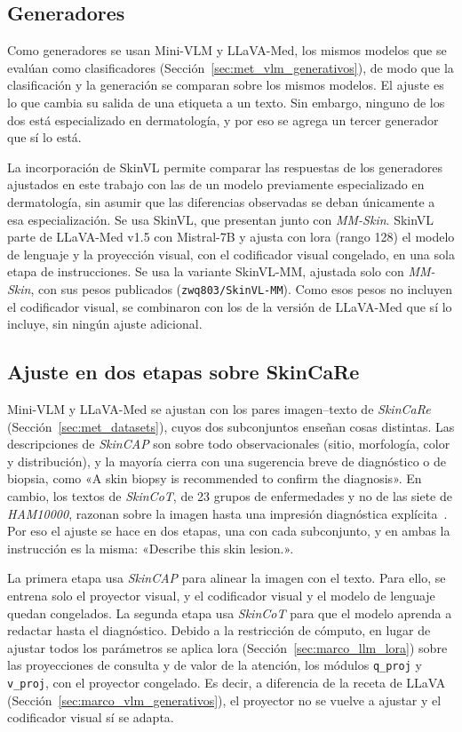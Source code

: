 \subsection{Generadores}

Como generadores se usan Mini-VLM y LLaVA-Med, los mismos modelos que se evalúan como clasificadores
(Sección~\ref{sec:met_vlm_generativos}), de modo que la clasificación y la generación se comparan sobre los mismos
modelos. El ajuste es lo que cambia su salida de una etiqueta a un texto. Sin embargo, ninguno de los dos está
especializado en dermatología, y por eso se agrega un tercer generador que sí lo está.

La incorporación de SkinVL permite comparar las respuestas de los generadores ajustados en este trabajo con las de un modelo previamente especializado en dermatología, sin asumir que las diferencias observadas se deban únicamente a esa especialización. Se usa SkinVL, que \textcite{zeng2025mmskin} presentan junto con \emph{MM-Skin}. SkinVL parte de LLaVA-Med v1.5 con
Mistral-7B y ajusta con \gls{lora} (rango 128) el modelo de lenguaje y la proyección visual, con el codificador visual
congelado, en una sola etapa de instrucciones. Se usa la variante SkinVL-MM, ajustada solo con \emph{MM-Skin}, con sus
pesos publicados (\texttt{zwq803/SkinVL-MM}). Como esos pesos no incluyen el codificador visual, se combinaron con los
de la versión de LLaVA-Med que sí lo incluye, sin ningún ajuste adicional.

\subsection{Ajuste en dos etapas sobre SkinCaRe}

Mini-VLM y LLaVA-Med se ajustan con los pares imagen--texto de \emph{SkinCaRe} (Sección~\ref{sec:met_datasets}), cuyos
dos subconjuntos enseñan cosas distintas. Las descripciones de \emph{SkinCAP} son sobre todo observacionales (sitio,
morfología, color y distribución), y la mayoría cierra con una sugerencia breve de diagnóstico o de biopsia, como «A
skin biopsy is recommended to confirm the diagnosis». En cambio, los textos de \emph{SkinCoT}, de 23 grupos de
enfermedades y no de las siete de \emph{HAM10000}, razonan sobre la imagen hasta una impresión diagnóstica
explícita~\cite{shen2025skincare}. Por eso el ajuste se hace en dos etapas, una con cada subconjunto, y en ambas la
instrucción es la misma: «Describe this skin lesion.».

La primera etapa usa \emph{SkinCAP} para alinear la imagen con el texto. Para ello, se entrena solo el proyector
visual, y el codificador visual y el modelo de lenguaje quedan congelados. La segunda etapa usa \emph{SkinCoT} para
que el modelo aprenda a redactar hasta el diagnóstico. Debido a la restricción de cómputo, en lugar de ajustar todos
los parámetros se aplica \gls{lora} (Sección~\ref{sec:marco_llm_lora}) sobre las proyecciones de consulta y de valor
de la atención, los módulos \texttt{q\_proj} y \texttt{v\_proj}, con el proyector congelado. Es decir, a diferencia de
la receta de LLaVA (Sección~\ref{sec:marco_vlm_generativos}), el proyector no se vuelve a ajustar y el codificador
visual sí se adapta.

